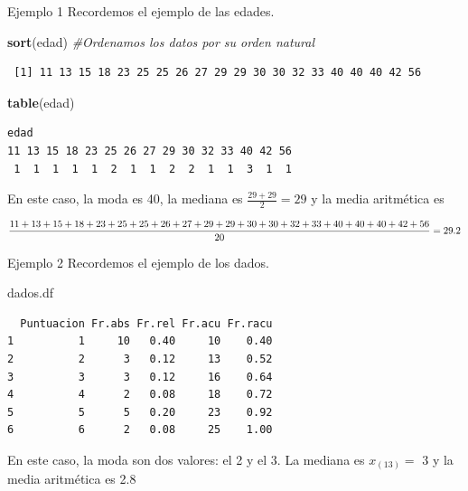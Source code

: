 \documentclass[
  ignorenonframetext,
]{beamer}
\newenvironment{Shaded}{\begin{snugshade}}{\end{snugshade}}
\newcommand{\CommentTok}[1]{\textcolor[rgb]{0.56,0.35,0.01}{\textit{#1}}}
\newcommand{\FunctionTok}[1]{\textcolor[rgb]{0.13,0.29,0.53}{\textbf{#1}}}
\newcommand{\NormalTok}[1]{#1}
\begin{document}
\begin{frame}[fragile]{Ejemplo 1}
\label{ejemplo-1-11}
Recordemos el ejemplo de las edades.

\begin{Shaded}
\begin{Highlighting}[]
\FunctionTok{sort}\NormalTok{(edad) }\CommentTok{\#Ordenamos los datos por su orden natural}
\end{Highlighting}
\end{Shaded}

\begin{verbatim}
 [1] 11 13 15 18 23 25 25 26 27 29 29 30 30 32 33 40 40 40 42 56
\end{verbatim}

\begin{Shaded}
\begin{Highlighting}[]
\FunctionTok{table}\NormalTok{(edad)}
\end{Highlighting}
\end{Shaded}

\begin{verbatim}
edad
11 13 15 18 23 25 26 27 29 30 32 33 40 42 56 
 1  1  1  1  1  2  1  1  2  2  1  1  3  1  1 
\end{verbatim}

En este caso, la moda es 40, la mediana es \(\frac{29+29}{2}=29\) y la
media aritmética es

\[\tiny{\frac{11+13+15+18+23+25+25+26+27+29+29+30+30+32+33+40+40+40+42+56}{20}=29.2}\]
\end{frame}

\begin{frame}[fragile]{Ejemplo 2}
\label{ejemplo-2-8}
Recordemos el ejemplo de los dados.

\begin{Shaded}
\begin{Highlighting}[]
\NormalTok{dados.df}
\end{Highlighting}
\end{Shaded}

\begin{verbatim}
  Puntuacion Fr.abs Fr.rel Fr.acu Fr.racu
1          1     10   0.40     10    0.40
2          2      3   0.12     13    0.52
3          3      3   0.12     16    0.64
4          4      2   0.08     18    0.72
5          5      5   0.20     23    0.92
6          6      2   0.08     25    1.00
\end{verbatim}

En este caso, la moda son dos valores: el 2 y el 3. La mediana es
\(x_{(13)}=\) 3 y la media aritmética es 2.8
\end{frame}
\end{document}
